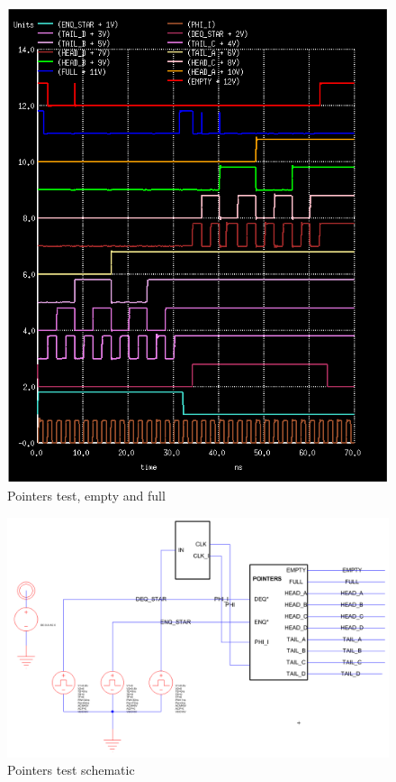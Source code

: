 \documentclass[12pt]{report}
\begin{document}
\begin{figure}[H]
  \centering
    \includegraphics[width=1.0\textwidth]{pointers_test_empty_full.PNG}
  \caption{Pointers test, empty and full}
  \label{fig:pointers_test_empty_full}
\end{figure}
\begin{figure}[H]
  \centering
    \includegraphics[width=1.0\textwidth]{TestSchematics/pointers.PNG}
  \caption{Pointers test schematic}
\end{figure}
\end{document}
